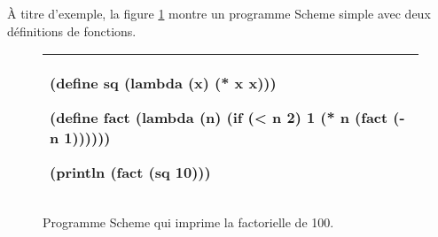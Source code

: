 À titre d'exemple, la figure \ref{fig:fact100} montre un programme Scheme
simple avec deux définitions de fonctions.
\begin{figure}[htbp]
  \begin{tabular}{|l|}\hline
\begin{mplisting}{0.7}
(define sq (lambda (x) (* x x)))

(define fact
  (lambda (n)
    (if (< n 2)
        1
        (* n (fact (- n 1))))))

(println (fact (sq 10)))
\end{mplisting}\\\hline
\end{tabular}

\caption{Programme Scheme qui imprime la factorielle de 100.}

\label{fig:fact100}
\end{figure}








